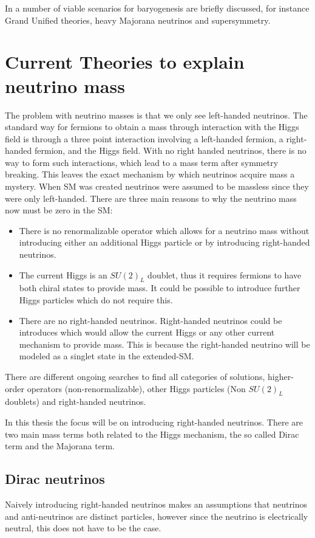 In \cite{36CRC} a number of viable scenarios for baryogenesis are briefly discussed, for instance Grand Unified theories, heavy Majorana neutrinos and supersymmetry.

\section{Current Theories to explain neutrino mass}
The problem with neutrino masses is that we only see left-handed neutrinos. The standard way for fermions to obtain a mass through interaction with the Higgs field is through a three point interaction involving a left-handed fermion, a right-handed fermion, and the Higgs field. With no right handed neutrinos, there is no way to form such interactions, which lead to a mass term after symmetry breaking. This leaves the exact mechanism by which neutrinos acquire mass a mystery. When SM was created neutrinos were assumed to be massless since they were only left-handed. There are three main reasons to why the neutrino mass now must be zero in the SM:
\begin{itemize}
\item There is no renormalizable operator which allows for a neutrino mass without introducing either an additional Higgs particle or by introducing right-handed neutrinos.

\item The current Higgs is an $SU(2)_L$ doublet, thus it requires fermions to have both chiral states to provide mass. It could be possible to introduce further Higgs particles which do not require this.

\item There are no right-handed neutrinos. Right-handed neutrinos could be introduces which would allow the current Higgs or any other current mechanism to provide mass. This is because the right-handed neutrino will be modeled as a singlet state in the extended-SM.
\end{itemize}

There are different ongoing searches to find all categories of solutions, higher-order operators (non-renormalizable), other Higgs particles (Non $SU(2)_L $ doublets) and right-handed neutrinos.

In this thesis the focus will be on introducing right-handed neutrinos. There are two main mass terms both related to the Higgs mechanism, the so called Dirac term and the Majorana term.

\subsection{Dirac neutrinos}
Naively introducing right-handed neutrinos makes an assumptions that neutrinos and anti-neutrinos are distinct particles, however since the neutrino is electrically neutral, this does not have to be the case.
 
